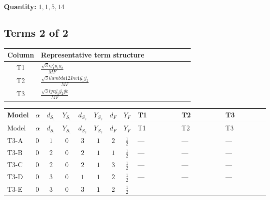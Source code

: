 \documentclass[8pt]{article}
\begin{document}
\begin{landscape}
\begin{longtable}{@{}llcccccc >{\raggedright\arraybackslash}p{0.21\linewidth} >{\raggedright\arraybackslash}p{0.21\linewidth} >{\raggedright\arraybackslash}p{0.21\linewidth}@{}}
\midrule
\bottomrule
\end{longtable}
\clearpage
\noindent\textbf{Quantity: }$\mathrm{1,1,5,14}$\par\smallskip
\subsection*{Terms 2 of 2}
\begin{center}
\begin{tabular}{@{}c >{\raggedright\arraybackslash}p{0.82\linewidth}@{}}
\toprule
Column & Representative term structure \\
\midrule
T1 & \(\displaystyle \frac{\sqrt{3} i g_{1}^{2} \overline{y_{1}} \overline{y_{2}}}{MF}\) \\
\midrule
T2 & \(\displaystyle \frac{\sqrt{3} i lambda12Inv1 \overline{y_{1}} \overline{y_{2}}}{MF}\) \\
\midrule
T3 & \(\displaystyle \frac{\sqrt{3} i ye \overline{y_{1}} \overline{y_{2}} \overline{ye}}{MF}\) \\
\midrule
\bottomrule
\end{tabular}
\end{center}
\smallskip
\tiny
\begin{longtable}{@{}llcccccc >{\raggedright\arraybackslash}p{0.21\linewidth} >{\raggedright\arraybackslash}p{0.21\linewidth} >{\raggedright\arraybackslash}p{0.21\linewidth}@{}}
\toprule
Model & $\alpha$ & $d_{S_1}$ & $Y_{S_1}$ & $d_{S_2}$ & $Y_{S_2}$ & $d_F$ & $Y_F$ & T1 & T2 & T3 \\
\midrule
\endfirsthead
\toprule
Model & $\alpha$ & $d_{S_1}$ & $Y_{S_1}$ & $d_{S_2}$ & $Y_{S_2}$ & $d_F$ & $Y_F$ & T1 & T2 & T3 \\
\midrule
\endhead
T3-A & $0$ & $1$ & $0$ & $3$ & $1$ & $2$ & $\frac{1}{2}$ & --- & --- & --- \\
\midrule
T3-B & $0$ & $2$ & $0$ & $2$ & $1$ & $1$ & $\frac{1}{2}$ & --- & --- & --- \\
\midrule
T3-C & $0$ & $2$ & $0$ & $2$ & $1$ & $3$ & $\frac{1}{2}$ & --- & --- & --- \\
\midrule
T3-D & $0$ & $3$ & $0$ & $1$ & $1$ & $2$ & $\frac{1}{2}$ & --- & --- & --- \\
\midrule
T3-E & $0$ & $3$ & $0$ & $3$ & $1$ & $2$ & $\frac{1}{2}$ & \scriptsize\adjustbox{max width=\linewidth}{$\begin{gathered} - \frac{\sqrt{3} i g_{1}^{2} \overline{y_{1}} \overline{y_{2}}}{8 MF}\end{gathered}$} & \scriptsize\adjustbox{max width=\linewidth}{$\begin{gathered} \frac{\sqrt{3} i lambda12Inv1 \overline{y_{1}} \overline{y_{2}}}{6 MF}\end{gathered}$} & \scriptsize\adjustbox{max width=\linewidth}{$\begin{gathered} \frac{\sqrt{3} i ye \overline{y_{1}} \overline{y_{2}} \overline{ye}}{12 MF}\end{gathered}$} \\
\midrule
\bottomrule
\end{longtable}
\clearpage

\end{landscape}
\end{document}
